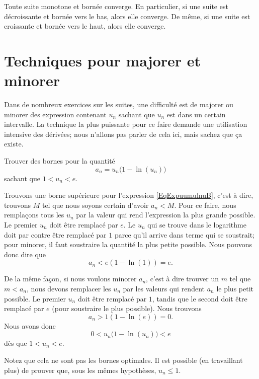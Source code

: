 \begin{proposition}		\label{Propsuiteborncv}
Toute suite monotone et bornée converge. En particulier, si une suite est décroissante et bornée vers le bas, alors elle converge. De même, si une suite est  croissante et bornée vers le haut, alors elle converge. 
\end{proposition}

\section{Techniques pour majorer et minorer}

Dans de nombreux exercices sur les suites, une difficulté est de majorer ou minorer des expression contenant $u_n$ sachant que $u_n$ est dans un certain intervalle. La technique la plus puissante pour ce faire demande une utilisation intensive des dérivées; nous n'allons pas parler de cela ici, mais sachez que ça existe.

\begin{example}
	Trouver	des bornes pour la quantité
	\begin{equation}		\label{EqExpuumulnuB}
		a_n=u_n\big( 1-\ln(u_n) \big)
	\end{equation}
	sachant que $1<u_n<e$.

	Trouvons une borne supérieure pour l'expression \eqref{EqExpuumulnuB}, c'est à dire, trouvons $M$ tel que nous soyons certain d'avoir $a_n<M$. Pour ce faire, nous remplaçons tous les $u_n$ par la valeur qui rend l'expression la plus grande possible. Le premier $u_n$ doit être remplacé par $e$. Le $u_n$ qui se trouve dans le logarithme doit par contre être remplacé par $1$ parce qu'il arrive dans terme qui se soustrait; pour minorer, il faut soustraire la quantité la plus petite possible. Nous pouvons donc dire que 
	\begin{equation}
		a_n<e(1-\ln(1))=e.
	\end{equation}
	
	De la même façon, si nous voulons minorer $a_n$, c'est à dire trouver un $m$ tel que $m<a_n$, nous devons remplacer les $u_n$ par les valeurs qui rendent $a_n$ le plus petit possible. Le premier $u_n$ doit être remplacé par $1$, tandis que le second doit être remplacé par $e$ (pour soustraire le plus possible). Nous trouvons
	\begin{equation}
		a_n>1(1-\ln(e))=0.
	\end{equation}
	Nous avons donc
	\begin{equation}
		0<u_n\big( 1-\ln(u_n) \big)<e
	\end{equation}
	dès que $1<u_n<e$.
	
	Notez que cela ne sont pas les bornes optimales. Il est possible (en travaillant plus) de prouver que, sous les mêmes hypothèses, $u_n\leq 1$.
\end{example}

